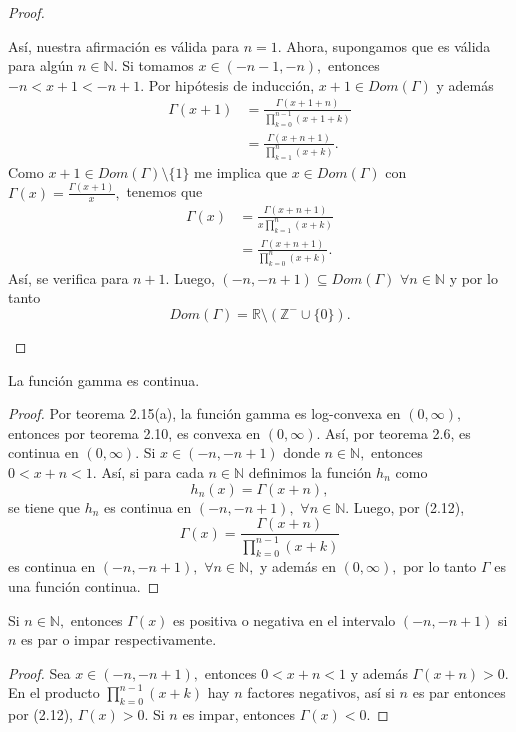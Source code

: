 \begin{proof}
\begin{enumerate}[(a)]
		Así, nuestra afirmación es válida para $n = 1.$ Ahora, supongamos que es válida para algún $n \in \mathbb{N}.$ Si tomamos $x \in (-n-1,-n),$ entonces $-n < x+1 < -n+1.$ Por hipótesis de inducción, $x+1 \in Dom(\Gamma)$ y además
		\begin{align*}
		\Gamma(x+1) &= \frac{\Gamma(x+1+n)}{\prod_{k = 0}^{n-1}(x+1+k)}\\
		&= \frac{\Gamma(x+n+1)}{\prod_{k = 1}^{n}(x+k)}.
		\end{align*}
		Como $x+1 \in Dom(\Gamma)\texttt{\textbackslash}\{1\}$ me implica que $x \in Dom(\Gamma)$ con $\Gamma(x) = \frac{\Gamma(x+1)}{x},$ tenemos que
		\begin{align*}
		\Gamma(x) &= \frac{\Gamma(x+n+1)}{x\prod_{k = 1}^{n}(x+k)}\\
		&= \frac{\Gamma(x+n+1)}{\prod_{k = 0}^{n}(x+k)}.
		\end{align*}
		Así, se verifica para $n+1.$ Luego, $(-n,-n+1)\subseteq Dom(\Gamma)$ $\forall n \in \mathbb{N}$ y por lo tanto $$Dom(\Gamma) = \mathbb{R}\texttt{\textbackslash}(\mathbb{Z}^-\cup \{0\}).$$
	\end{enumerate}
\end{proof}
\begin{corollary}
	La función gamma es continua.
\end{corollary}
\begin{proof}
	Por teorema 2.15(a), la función gamma es log-convexa en $(0,\infty),$ entonces por teorema 2.10, es convexa en $(0,\infty).$ Así, por teorema 2.6, es continua en $(0,\infty).$
	Si $x \in (-n,-n+1)$ donde $n \in \mathbb{N},$ entonces $0 < x+n < 1.$ Así, si para cada $n \in \mathbb{N}$ definimos la función $h_n$ como $$h_n(x) = \Gamma(x+n),$$ se tiene que $h_n$ es continua en $(-n,-n+1),$ $\forall n \in \mathbb{N}.$ Luego, por (2.12), $$\Gamma(x) = \frac{\Gamma(x+n)}{\prod_{k = 0}^{n-1}(x+k)}$$ es continua en $(-n,-n+1),$ $\forall n \in \mathbb{N},$ y además en $(0,\infty),$ por lo tanto $\Gamma$ es una función continua.
\end{proof}
\begin{corollary}
	Si $n \in \mathbb{N},$ entonces $\Gamma(x)$ es positiva o negativa en el intervalo $(-n,-n+1)$ si $n$ es par o impar respectivamente.
\end{corollary}
\begin{proof}
	Sea $x \in (-n,-n+1),$ entonces $0 < x+n < 1$ y además $\Gamma(x+n) > 0.$ En el producto $\prod_{k = 0}^{n-1}(x+k)$ hay $n$ factores negativos, así si $n$ es par entonces por (2.12), $\Gamma(x) > 0.$ Si $n$ es impar, entonces $\Gamma(x) < 0.$
\end{proof}

